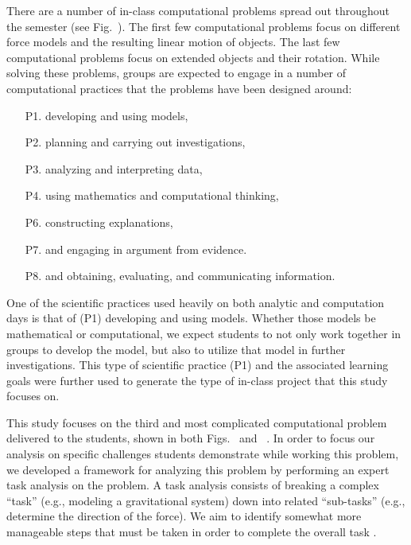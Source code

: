 \documentclass{msuphddissertation}
\begin{document}
\begin{doublespace}
There are a number of in-class computational problems spread out throughout the semester (see Fig.~).  The first few computational problems focus on different force models and the resulting linear motion of objects.  The last few computational problems focus on extended objects and their rotation.  While solving these problems, groups are expected to engage in a number of computational practices that the problems have been designed around: \begin{enumerate}
\item[P1.] developing and using models,
\item[P2.] planning and carrying out investigations,
\item[P3.] analyzing and interpreting data,
\item[P4.] using mathematics and computational thinking,
\item[P6.] constructing explanations,
\item[P7.] and engaging in argument from evidence.
\item[P8.] and obtaining, evaluating, and communicating information.
\end{enumerate}

One of the scientific practices used heavily on both analytic and computation days is that of (P1) developing and using models.  Whether those models be mathematical or computational, we expect students to not only work together in groups to develop the model, but also to utilize that model in further investigations.  This type of scientific practice (P1) and the associated learning goals\cite{Irving2017} were further used to generate the type of in-class project that this study focuses on.

This study focuses on the third and most complicated computational problem delivered to the students, shown in both Figs.~ and ~. In order to focus our analysis on specific challenges students demonstrate while working this problem, we developed a framework for analyzing this problem by performing an expert task analysis on the problem.  A task analysis consists of breaking a complex ``task'' (e.g., modeling a gravitational system) down into related ``sub-tasks'' (e.g., determine the direction of the force). We aim to identify somewhat more manageable steps that must be taken in order to complete the overall task \cite{catra}.


\end{doublespace}
\end{document}
